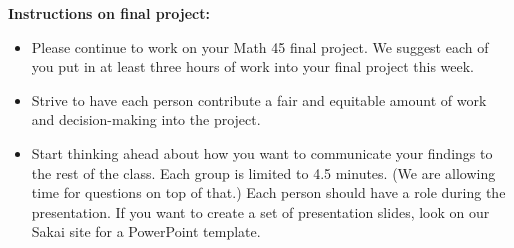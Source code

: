 \documentclass[12pt,letterpaper]{hmcpset}
\begin{document}
\newpage
\begin{solution}
    \null\vfill
\end{solution}
\newpage

\begin{problem}
    \textbf{Instructions on final project:} 
    \begin{itemize}
        \item Please continue to work on your Math 45 final project.  We suggest each of you put in at least three hours of work into your final project this week. 
        \item Strive to have each person contribute a fair and equitable amount of work and decision-making into the project. 
        \item Start thinking ahead about how you want to communicate your findings to the rest of the class.  Each group is limited to 4.5 minutes.  (We are allowing time for questions on top of that.)  Each person should have a role during the presentation.  If you want to create a set of presentation slides, look on our Sakai site for a PowerPoint template.  
    \end{itemize}
\end{problem}
\end{document}
